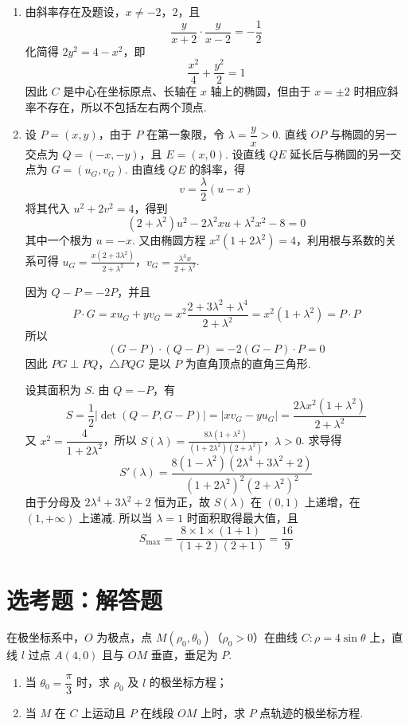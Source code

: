 \begin{solution}
\begin{enumerate}
\item 由斜率存在及题设，\(x\ne-2\)，\(2\)，且
\[
\frac{y}{x+2}\cdot\frac{y}{x-2}=-\frac12
\]
化简得 \(2y^2=4-x^2\)，即
\[
\frac{x^2}{4}+\frac{y^2}{2}=1
\]
因此 \(C\) 是中心在坐标原点、长轴在 \(x\) 轴上的椭圆，但由于 \(x=\pm2\) 时相应斜率不存在，所以不包括左右两个顶点.

\item 设 \(P=(x,y)\)，由于 \(P\) 在第一象限，令 \(\lambda=\dfrac yx>0\). 直线 \(OP\) 与椭圆的另一交点为 \(Q=(-x,-y)\)，且 \(E=(x,0)\). 设直线 \(QE\) 延长后与椭圆的另一交点为 \(G=(u_G,v_G)\). 由直线 \(QE\) 的斜率，得
\[
v=\frac{\lambda}{2}(u-x)
\]
将其代入 \(u^2+2v^2=4\)，得到
\[
(2+\lambda^2)u^2-2\lambda^2xu+\lambda^2x^2-8=0
\]
其中一个根为 \(u=-x\). 又由椭圆方程 \(x^2(1+2\lambda^2)=4\)，利用根与系数的关系可得
\(u_G=\frac{x(2+3\lambda^2)}{2+\lambda^2}\)，\(v_G=\frac{\lambda^3x}{2+\lambda^2}\).

因为 \(Q-P=-2P\)，并且
\[
P\cdot G=xu_G+yv_G
=x^2\frac{2+3\lambda^2+\lambda^4}{2+\lambda^2}
=x^2(1+\lambda^2)=P\cdot P
\]
所以
\[
(G-P)\cdot(Q-P)=-2(G-P)\cdot P=0
\]
因此 \(PG\perp PQ\)，\(\triangle PQG\) 是以 \(P\) 为直角顶点的直角三角形.

设其面积为 \(S\). 由 \(Q=-P\)，有
\[
S=\frac12\left|\det(Q-P,G-P)\right|=\left|xv_G-yu_G\right|=\frac{2\lambda x^2(1+\lambda^2)}{2+\lambda^2}
\]
又 \(x^2=\dfrac4{1+2\lambda^2}\)，所以
\(S(\lambda)=\frac{8\lambda(1+\lambda^2)}{(1+2\lambda^2)(2+\lambda^2)}\)，\(\lambda>0\).
求导得
\[
S'(\lambda)=\frac{8(1-\lambda^2)(2\lambda^4+3\lambda^2+2)}{(1+2\lambda^2)^2(2+\lambda^2)^2}
\]
由于分母及 \(2\lambda^4+3\lambda^2+2\) 恒为正，故 \(S(\lambda)\) 在 \((0,1)\) 上递增，在 \((1,+\infty)\) 上递减. 所以当 \(\lambda=1\) 时面积取得最大值，且
\[
S_{\max}=\frac{8\times1\times(1+1)}{(1+2)(2+1)}=\frac{16}{9}
\]
\end{enumerate}
\end{solution}

\section{选考题：解答题}

\begin{problem}
在极坐标系中，\(O\) 为极点，点 \(M(\rho_0,\theta_0)\)（\(\rho_0>0\)）在曲线 \(C:\rho=4\sin\theta\) 上，直线 \(l\) 过点 \(A(4,0)\) 且与 \(OM\) 垂直，垂足为 \(P\).

\begin{enumerate}
\item 当 \(\theta_0=\dfrac{\pi}{3}\) 时，求 \(\rho_0\) 及 \(l\) 的极坐标方程；
\item 当 \(M\) 在 \(C\) 上运动且 \(P\) 在线段 \(OM\) 上时，求 \(P\) 点轨迹的极坐标方程.
\end{enumerate}
\end{problem}

